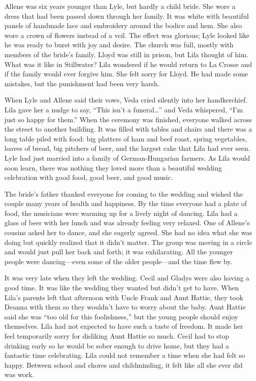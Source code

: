 \documentclass[
  american,
  letterpaper,
]{book}
\begin{document}
Allene was six years younger than Lyle, but hardly a child bride. She
wore a dress that had been passed down through her family. It was white
with beautiful panels of handmade lace and embroidery around the bodice
and hem. She also wore a crown of flowers instead of a veil. The effect
was glorious; Lyle looked like he was ready to burst with joy and
desire. The church was full, mostly with members of the bride's family.
Lloyd was still in prison, but Lila thought of him. What was it like in
Stillwater? Lila wondered if he would return to La Crosse and if the
family would ever forgive him. She felt sorry for Lloyd. He had made
some mistakes, but the punishment had been very harsh.

When Lyle and Allene said their vows, Veda cried silently into her
handkerchief. Lila gave her a nudge to say, ``This isn't a
funeral\ldots{}'' and Veda whispered, ``I'm just so happy for them.''
When the ceremony was finished, everyone walked across the street to
another building. It was filled with tables and chairs and there was a
long table piled with food: big platters of ham and beef roast, spring
vegetables, loaves of bread, big pitchers of beer, and the largest cake
that Lila had ever seen. Lyle had just married into a family of
German-Hungarian farmers. As Lila would soon learn, there was nothing
they loved more than a beautiful wedding celebration with good food,
good beer, and good music.

The bride's father thanked everyone for coming to the wedding and wished
the couple many years of health and happiness. By the time everyone had
a plate of food, the musicians were warming up for a lively night of
dancing. Lila had a glass of beer with her lunch and was already feeling
very relaxed. One of Allene's cousins asked her to dance, and she
eagerly agreed. She had no idea what she was doing but quickly realized
that it didn't matter. The group was moving in a circle and would just
pull her back and forth; it was exhilarating. All the younger people
were dancing---even some of the older people---and the time flew by.

It was very late when they left the wedding. Cecil and Gladys were also
having a good time. It was like the wedding they wanted but didn't get
to have. When Lila's parents left that afternoon with Uncle Frank and
Aunt Hattie, they took Deanna with them so they wouldn't have to worry
about the baby. Aunt Hattie said she was ``too old for this
foolishness,'' but the young people should enjoy themselves. Lila had
not expected to have such a taste of freedom. It made her feel
temporarily sorry for disliking Aunt Hattie so much. Cecil had to stop
drinking early so he would be sober enough to drive home, but they had a
fantastic time celebrating. Lila could not remember a time when she had
felt so happy. Between school and chores and childminding, it felt like
all she ever did was work.
\end{document}
